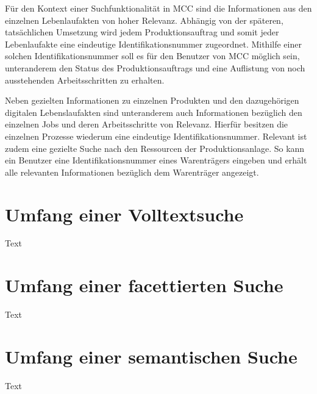 Für den Kontext einer Suchfunktionalität in MCC sind die Informationen aus den einzelnen Lebenlaufakten von hoher Relevanz. Abhängig von der späteren, tatsächlichen Umsetzung wird jedem Produktionsauftrag und somit jeder Lebenlaufakte eine eindeutige Identifikationsnummer zugeordnet. Mithilfe einer solchen Identifikationsnummer soll es für den Benutzer von MCC möglich sein, unteranderem den Status des Produktionsauftrags und eine Auflistung von noch ausstehenden Arbeitsschritten zu erhalten.

Neben gezielten Informationen zu einzelnen Produkten und den dazugehörigen digitalen Lebenslaufakten sind unteranderem auch Informationen bezüglich den einzelnen Jobs und deren Arbeitsschritte von Relevanz. Hierfür besitzen die einzelnen Prozesse wiederum eine eindeutige Identifikationsnummer. Relevant ist zudem eine gezielte Suche nach den Ressourcen der Produktionsanlage. So kann ein Benutzer eine Identifikationsnummer eines Warenträgers eingeben und erhält alle relevanten Informationen bezüglich dem Warenträger angezeigt.


\section{Umfang einer Volltextsuche\label{sec3.2:Unterunterpunkt-2}}

Text

\section{Umfang einer facettierten Suche\label{sec3.3:Unterpunkt-3}}

Text

\section{Umfang einer semantischen Suche\label{sec3.4:Unterpunkt-4}}

Text